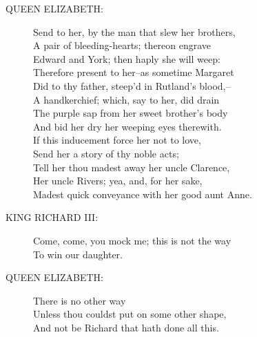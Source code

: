 \documentclass{article}
\begin{document}
\begin{description}
\item[QUEEN ELIZABETH:] 
\hspace{1pt}Send to her, by the man that slew her brothers,\\
\hspace{1pt}A pair of bleeding-hearts; thereon engrave\\
\hspace{1pt}Edward and York; then haply she will weep:\\
\hspace{1pt}Therefore present to her--as sometime Margaret\\
\hspace{1pt}Did to thy father, steep'd in Rutland's blood,--\\
\hspace{1pt}A handkerchief; which, say to her, did drain\\
\hspace{1pt}The purple sap from her sweet brother's body\\
\hspace{1pt}And bid her dry her weeping eyes therewith.\\
\hspace{1pt}If this inducement force her not to love,\\
\hspace{1pt}Send her a story of thy noble acts;\\
\hspace{1pt}Tell her thou madest away her uncle Clarence,\\
\hspace{1pt}Her uncle Rivers; yea, and, for her sake,\\
\hspace{1pt}Madest quick conveyance with her good aunt Anne.\\
\end{description}
\begin{description}
\item[KING RICHARD III:] 
\hspace{1pt}Come, come, you mock me; this is not the way\\
\hspace{1pt}To win our daughter.\\
\end{description}
\begin{description}
\item[QUEEN ELIZABETH:] 
\hspace{1pt}There is no other way\\
\hspace{1pt}Unless thou couldst put on some other shape,\\
\hspace{1pt}And not be Richard that hath done all this.\\
\end{description}
\end{document}
